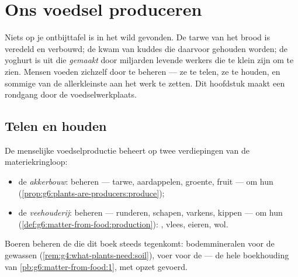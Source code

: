 \chapter{Ons voedsel produceren}\label{ch:g6:producing-our-food}

Niets op je ontbijttafel is in het wild gevonden. De tarwe van het brood
is veredeld en verbouwd; de  kwam van kuddes die daarvoor gehouden
worden; de yoghurt is uit die  \emph{gemaakt} door miljarden levende
werkers die te klein zijn om te zien. Mensen voeden zichzelf door  te beheren --- ze te telen, ze te houden, en sommige van de
allerkleinste aan het werk te zetten. Dit hoofdstuk maakt een rondgang
door de voedselwerkplaats.

\section{Telen en houden}

\begin{definition}\label{def:g6:producing-our-food:farming}
De menselijke voedselproductie beheert  op twee
verdiepingen van de materiekringloop:
\begin{itemize}
  \item de \emph{akkerbouw}:  beheren --- tarwe,
        aardappelen, groente, fruit --- om hun 
        (\cref{prop:g6:plants-are-producers:produce});
  \item de \emph{veehouderij}:  beheren ---
        runderen, schapen, varkens, kippen --- om hun 
        (\cref{def:g6:matter-from-food:production}): , vlees,
        eieren, wol.
\end{itemize}
Boeren beheren de  die dit boek steeds tegenkomt:
bodemmineralen voor de gewassen (\cref{rem:g4:what-plants-need:soil}),
voer voor de  --- de hele boekhouding van
\cref{pb:g6:matter-from-food:1}, met opzet gevoerd.
\end{definition}

